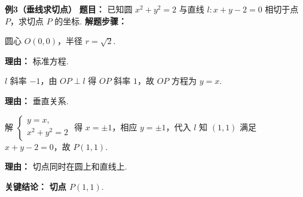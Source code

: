 \begin{examplebox}
	\medskip
	\textbf{\textcolor{CExample}{例3（垂线求切点）}}
	\textbf{\textcolor{CExample}{题目：}}
	已知圆 $x^2+y^2=2$ 与直线 $l: x+y-2=0$ 相切于点 $P$，求切点 $P$ 的坐标.
	\textbf{\textcolor{CExample}{解题步骤：}}
	\begin{description}[style=nextline, leftmargin=2.8em, labelsep=0.5em, itemsep=0.45em]
		\item[\textbf{第一步（求圆心半径）：}]
			圆心 $O(0,0)$，半径 $r=\sqrt2$.
			\par\textbf{理由：} 标准方程.
		\item[\textbf{第二步（求垂线方程）：}]
			$l$ 斜率 $-1$，由 $OP\perp l$ 得 $OP$ 斜率 $1$，故 $OP$ 方程为 $y=x$.
			\par\textbf{理由：} 垂直关系.
		\item[\textbf{第三步（联立求切点）：}]
			解 $
			\begin{cases}
				y=x,\\x^2+y^2=2
		\end{cases}
			$ 得 $x=\pm1$，相应 $y=\pm1$，代入 $l$ 知 $(1,1)$ 满足 $x+y-2=0$，故 $P(1,1)$.
			\par\textbf{理由：} 切点同时在圆上和直线上.
	\end{description}
	\textbf{\textcolor{CExample}{关键结论：}}
	\textbf{切点 $P(1,1)$}.
\end{examplebox}
